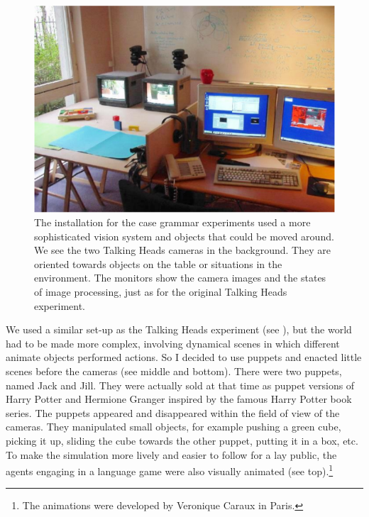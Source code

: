 \begin{figure}[htbp]
  \centerline{\includegraphics[width=.60\textwidth]{chap10/figs/peract-setup.pdf}}
\caption{\label{fig:peract-setup} 
The installation for the case grammar experiments used a more sophisticated vision system and objects that 
could be moved around. We see the two Talking Heads cameras in 
the background. They are oriented towards objects on the table or situations in the 
environment. The monitors show the camera images and the states of image processing, just as for the original 
Talking Heads experiment. 
}
\end{figure}

We used a similar set-up as the Talking Heads experiment (see ), but 
the world had to be made more complex, involving dynamical scenes in which 
different animate objects performed actions. So I decided to use 
puppets and enacted little scenes before the cameras (see  middle and bottom). 
There were two puppets, named Jack and Jill. They were actually sold at that time as puppet versions of Harry 
Potter and Hermione Granger inspired by the famous Harry Potter book series. 
The puppets appeared and disappeared within the field of view of the cameras. 
They manipulated small objects, for example pushing a green cube, picking it up, sliding the cube
towards the other puppet, putting it in a box, etc. To make the simulation more lively and easier to follow for 
a lay public, the agents engaging in a language game were also visually animated (see 
 top).\footnote{The animations were developed by Veronique Caraux in Paris.}


